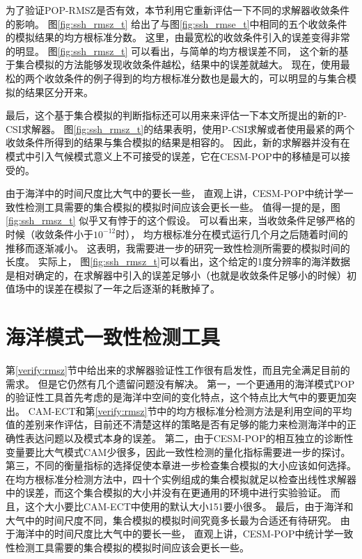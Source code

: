 为了验证POP-RMSZ是否有效，本节利用它重新评估一下不同的求解器收敛条件的影响。
图\ref{fig:ssh_rmsz_t} 给出了与图\ref{fig:ssh_rmse_t}中相同的五个收敛条件的模拟结果的均方根标准分数。
这里，由最宽松的收敛条件引入的误差变得非常的明显。  
图\ref{fig:ssh_rmsz_t} 可以看出，与简单的均方根误差不同， 这个新的基于集合模拟的方法能够发现收敛条件越松，结果中的误差就越大。 
现在，使用最松的两个收敛条件的例子得到的均方根标准分数也是最大的，可以明显的与集合模拟的结果区分开来。 

最后，这个基于集合模拟的判断指标还可以用来来评估一下本文所提出的新的P-CSI求解器。 图\ref{fig:ssh_rmsz_t}的结果表明，使用P-CSI求解或者使用最紧的两个收敛条件所得到的结果与集合模拟的结果是相容的。 
因此，新的求解器并没有在模式中引入气候模式意义上不可接受的误差，它在CESM-POP中的移植是可以接受的。  
 
由于海洋中的时间尺度比大气中的要长一些， 直观上讲，CESM-POP中统计学一致性检测工具需要的集合模拟的模拟时间应该会更长一些。 
值得一提的是，图\ref{fig:ssh_rmsz_t} 似乎又有悖于的这个假设。 
可以看出来，当收敛条件足够严格的时候（收敛条件小于$10^{-12}$时）， 均方根标准分在模式运行几个月之后随着时间的推移而逐渐减小。
这表明，我需要进一步的研究一致性检测所需要的模拟时间的长度。 
实际上， 图\ref{fig:ssh_rmsz_t}可以看出，这个给定的1度分辨率的海洋数据是相对确定的，在求解器中引入的误差足够小（也就是收敛条件足够小的时候）初值场中的误差在模拟了一年之后逐渐的耗散掉了。



\section{海洋模式一致性检测工具}\label{verify:ECT}


第\ref{verify:rmsz}节中给出来的求解器验证性工作很有启发性，而且完全满足目前的需求。 
但是它仍然有几个遗留问题没有解决。 
第一，一个更通用的海洋模式POP的验证性工具首先考虑的是海洋中空间的变化特点，这个特点比大气中的要更加突出。
CAM-ECT和第\ref{verify:rmsz}节中的均方根标准分检测方法是利用空间的平均值的差别来作评估，目前还不清楚这样的策略是否有足够的能力来检测海洋中的正确性表达问题以及模式本身的误差。
第二，由于CESM-POP的相互独立的诊断性变量要比大气模式CAM少很多，因此一致性检测的量化指标需要进一步的探讨。
第三，不同的衡量指标的选择促使本章进一步检查集合模拟的大小应该如何选择。
在均方根标准分检测方法中，四十个实例组成的集合模拟就足以检查出线性求解器中的误差，而这个集合模拟的大小并没有在更通用的环境中进行实验验证。
而且，这个大小要比CAM-ECT中使用的默认大小151要小很多。
最后，由于海洋和大气中的时间尺度不同，集合模拟的模拟时间究竟多长最为合适还有待研究。 
由于海洋中的时间尺度比大气中的要长一些， 直观上讲，CESM-POP中统计学一致性检测工具需要的集合模拟的模拟时间应该会更长一些。 

